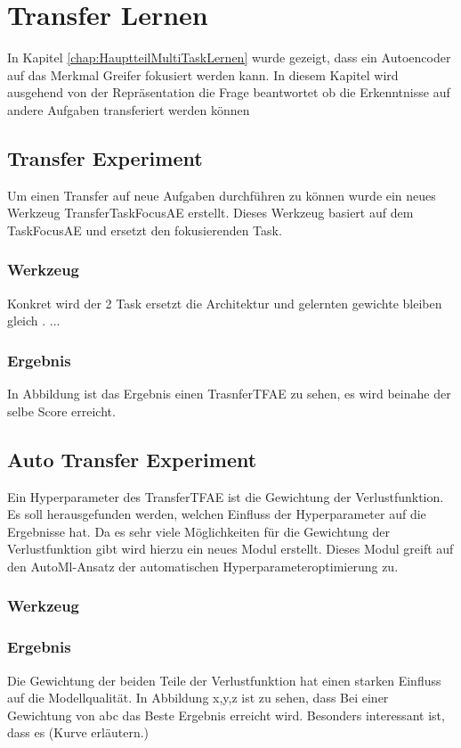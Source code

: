 \chapter{Transfer Lernen}
\label{chap:HauptteilTransferLernen}
In Kapitel \ref{chap:HauptteilMultiTaskLernen} wurde gezeigt, dass ein Autoencoder auf das Merkmal Greifer fokusiert werden kann. In diesem Kapitel wird ausgehend von der Repräsentation die Frage beantwortet ob die Erkenntnisse auf andere Aufgaben transferiert werden können

	\section{Transfer Experiment}
	\label{sec:todo}
	Um einen Transfer auf neue Aufgaben durchführen zu können wurde ein neues Werkzeug TransferTaskFocusAE erstellt. Dieses Werkzeug basiert auf dem TaskFocusAE und ersetzt den fokusierenden Task.
	\subsection{Werkzeug}
	Konkret wird der 2 Task ersetzt die Architektur und gelernten gewichte bleiben gleich	. ...  
	\subsection{Ergebnis}
	In Abbildung ist das Ergebnis einen TrasnferTFAE zu sehen, es wird beinahe der selbe Score erreicht.


	\section{Auto Transfer Experiment}
	\label{sec:todo}
	Ein Hyperparameter des TransferTFAE ist die Gewichtung der Verlustfunktion. Es soll herausgefunden werden, welchen Einfluss der Hyperparameter auf die Ergebnisse hat. Da es sehr viele Möglichkeiten für die Gewichtung der Verlustfunktion gibt wird hierzu ein neues Modul erstellt. Dieses Modul greift auf den AutoMl-Ansatz der automatischen Hyperparameteroptimierung zu.
	\subsection{Werkzeug}
	\subsection{Ergebnis}
	Die Gewichtung der beiden Teile der Verlustfunktion hat einen starken Einfluss auf die Modellqualität. In Abbildung x,y,z  ist zu sehen, dass Bei einer Gewichtung von abc das Beste Ergebnis erreicht wird. Besonders interessant ist, dass es  (Kurve erläutern.)


